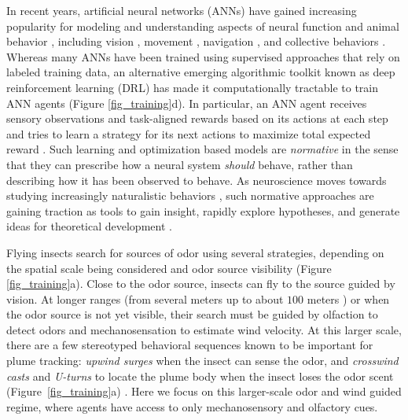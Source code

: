 \documentclass[5p,twocolumn,authoryear]{elsarticle}
\begin{document}
In recent years, artificial neural networks (ANNs) have gained increasing popularity for modeling and understanding aspects of neural function and animal behavior \citep{kietzmann2019deep, cichy2019deep}, including vision \citep{kriegeskorte2015deep}, movement \citep{sussillo2015neural}, navigation   \citep{kanitscheider2017training, cueva2018emergence, cueva2019emergence, haesemeyer2019convergent}, and collective behaviors \citep{verma2018efficient}. 
Whereas many ANNs have been trained using supervised approaches that rely on labeled training data, an alternative emerging algorithmic toolkit known as deep reinforcement learning (DRL) has made it computationally tractable to train ANN agents (Figure \ref{fig_training}d).
In particular, an ANN agent receives sensory observations and task-aligned rewards based on its actions at each step and tries to learn a strategy for its next actions to maximize total expected reward  \citep{arulkumaran2017deep,sutton2018reinforcement}.
Such learning and optimization based models are \textit{normative} in the sense that they can prescribe how a neural system \textit{should} behave, rather than describing how it has been observed to behave.
As neuroscience moves towards studying increasingly naturalistic behaviors \citep{nastase2020keep,sonkusare2019naturalistic,huk_beyond_2018,GOMEZMARIN201925}, such normative approaches are gaining traction as tools to gain insight, rapidly explore hypotheses, and generate ideas for theoretical development  \citep{richards2019deep,le2020towards,merel2019deep,ahrens2019zebrafish,banino2018vector,colabrese2017flow,verma2018efficient}. 


Flying insects search for sources of odor using several strategies, depending on the spatial scale being considered and odor source visibility \citep{baker2018algorithms} (Figure \ref{fig_training}a). 
Close to the odor source, insects can fly to the source guided by vision.
At longer ranges (from several meters up to about $100$ meters \citep{wall1987range}) or when the odor source is not yet visible, their search must be guided by olfaction to detect odors and mechanosensation to estimate wind velocity.
At this larger scale, there are a few stereotyped behavioral sequences known to be important for plume tracking: 
\textit{upwind surges} when the insect can sense the odor, and 
\textit{crosswind casts} and \textit{U-turns} to locate the plume body when the insect loses the odor scent (Figure~\ref{fig_training}a) \citep{carde2008navigational}.
Here we focus on this larger-scale odor and wind guided regime, where agents have access to only mechanosensory and olfactory cues.
\end{document}
